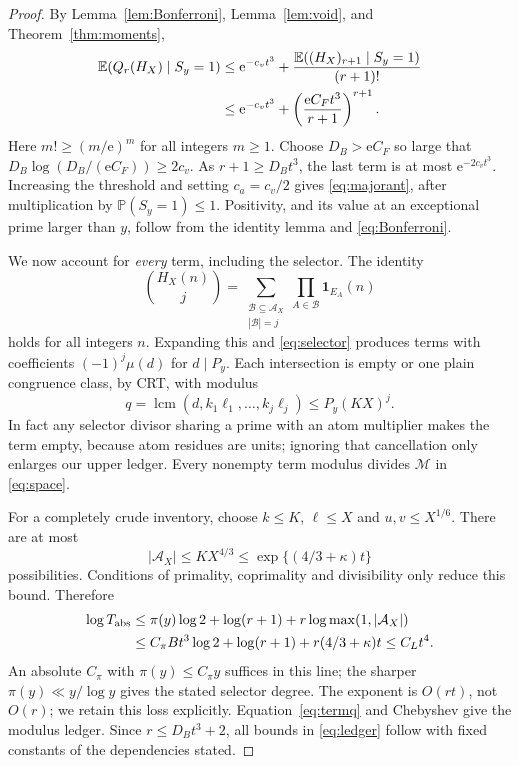 \documentclass[10pt,reqno]{amsart}
\theoremstyle{remark}
\newcommand{\A}{\mathcal A}
\newcommand{\E}{\mathbb E}
\newcommand{\Prob}{\mathbb P}
\newcommand{\ind}{\mathbf1}
\newcommand{\lcm}{\operatorname{lcm}}
\newcommand{\e}{\mathrm e}
\begin{document}
\begin{proof}
By Lemma~\ref{lem:Bonferroni}, Lemma~\ref{lem:void}, and
Theorem~\ref{thm:moments},
\begin{align}
 \E(Q_r(H_X)\mid S_y=1)
 &\leq\e^{-c_vt^3}+
             \frac{\E((H_X)_{r+1}\mid S_y=1)}{(r+1)!}\notag\\
 &\leq\e^{-c_vt^3}+
             \left(\frac{\e C_Ft^3}{r+1}\right)^{r+1}.
                                                    \label{eq:Btail}
\end{align}
Here $m!\geq(m/\e)^m$ for all integers $m\geq1$.
Choose $D_B>\e C_F$ so large that
$D_B\log(D_B/(\e C_F))\geq2c_v$.  As $r+1\geq D_Bt^3$, the last
term is at most $\e^{-2c_vt^3}$.  Increasing the threshold and setting
$c_a=c_v/2$ gives \eqref{eq:majorant}, after multiplication by
$\Prob(S_y=1)\leq1$.  Positivity, and its value at an exceptional prime
larger than $y$, follow from the identity lemma and \eqref{eq:Bonferroni}.

We now account for \emph{every} term, including the selector.  The identity
\[
 \binom{H_X(n)}j=\sum_{\substack{\mathcal B\subseteq\A_X\\|\mathcal B|=j}}
                              \prod_{A\in\mathcal B}\ind_{E_A}(n)
\]
holds for all integers $n$.  Expanding this and \eqref{eq:selector}
produces terms with coefficients $(-1)^j\mu(d)$ for $d\mid P_y$.
Each intersection is empty or one plain congruence class, by CRT,
with modulus
\begin{equation}\label{eq:termq}
 q=\lcm(d,k_1\ell_1,\ldots,k_j\ell_j)
             \leq P_y(KX)^j.
\end{equation}
In fact any selector divisor sharing a prime with an atom multiplier
makes the term empty, because atom residues are units; ignoring that
cancellation only enlarges our upper ledger.
Every nonempty term modulus divides $\mathcal M$ in \eqref{eq:space}.

For a completely crude inventory, choose $k\leq K$, $\ell\leq X$ and
$u,v\leq X^{1/6}$.  There are at most
\begin{equation}\label{eq:inventory}
 |\A_X|\leq KX^{4/3}\leq\exp\{(4/3+\kappa)t\}
\end{equation}
possibilities.  Conditions of primality, coprimality and divisibility
only reduce this bound.  Therefore
\begin{align}
 \log T_{\rm abs}
 &\leq\pi(y)\log2+\log(r+1)
               +r\log\max(1,|\A_X|)\notag\\
 &\leq C_\pi Bt^3\log2+\log(r+1)
                         +r(4/3+\kappa)t\leq C_Lt^4.\label{eq:termcount}
\end{align}
An absolute $C_\pi$ with $\pi(y)\leq C_\pi y$ suffices in this line;
the sharper $\pi(y)\ll y/\log y$ gives the stated selector degree.
The exponent is $O(rt)$, not $O(r)$; we retain this loss explicitly.
Equation~\eqref{eq:termq} and Chebyshev give the modulus ledger.
Since $r\leq D_Bt^3+2$, all bounds in \eqref{eq:ledger} follow with fixed
constants of the dependencies stated.


\end{proof}
\end{document}
